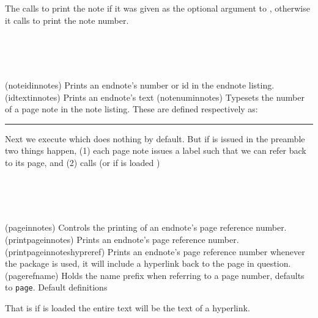 The \cmd{\noteidinnotes} calls \cmd{\idtextinnotes} to print the note 
if it was given as the optional argument to , 
otherwise it calls \cmd{\notenuminnotes} to print the note number.
\begin{syntax}
\cmd{\noteidinnotes} \\
\cmd{\idtextinnotes} \\
\cmd{\notenuminnotes} \\
\end{syntax}
\glossary(noteidinnotes)%
  {}%
  {Prints an endnote's number or id in the endnote listing.}%
\glossary(idtextinnotes)%
  {}%
  {Prints an endnote's  text}%
\glossary(notenuminnotes)%
  {}%
  {Typesets the number  of a page note in the note listing.}%
These are defined respectively as:
\begin{lcode}
\newcommand*{\idtextinnotes}[1]{[#1]\space}
\newcommand*{\notenuminnotes}[1]{\normalfont #1.\space}
\end{lcode}

\fancybreak{}

Next we execute \cmd{\pageinnotes} which does
nothing by default. But if \cmd{\notepageref} is issued in the
preamble two things happen, (1) each page note issues a label such
that we can refer back to its page, and (2) \cmd{\pageinnotes} calls
\cmd{\printpageinnotes} (or if  is loaded
\cmd{\printpageinnoteshyperref}) 
\begin{syntax}
\cmd{\pageinnotes}\\
\cmd{\printpageinnotes}\\  
\cmd{\printpageinnoteshyperref}\\
\end{syntax}
\glossary(pageinnotes)%
{}%
{Controls the printing of an endnote's page reference number.}%
\glossary(printpageinnotes)%
{}%
{Prints an endnote's page reference number.}%
\glossary(printpageinnoteshypreref)%
{}%
{Prints an endnote's page reference number whenever the
  \protect{} package is used, it will include a
  hyperlink back to the page in question.}%
\glossary(pagerefname)%
{}%
{Holds the name prefix when referring to a page number, defaults to \texttt{page}.}%
Default definitions
\begin{lcode}
\newcommand*{\printpageinnotes}[1]{%
    (\pagerefname\ \pageref{#1})\space}
\newcommand\printpageinnoteshyperref[1]{%
   (\hyperref[#1]{\pagerefname\ \pageref*{#1}})\space}
\end{lcode}
That is if  is loaded the entire text 
will be the text of a hyperlink.

